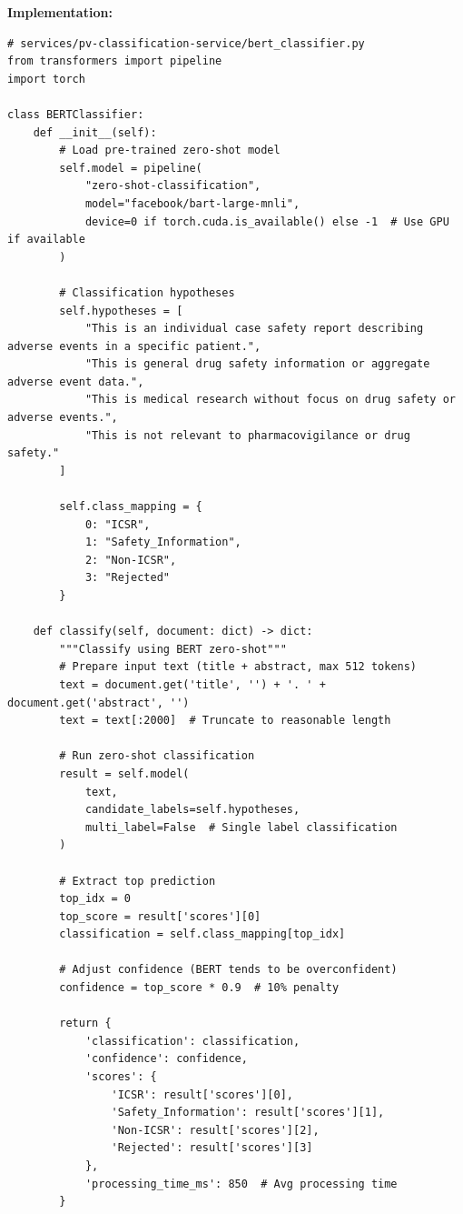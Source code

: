 \textbf{Implementation:}
\begin{lstlisting}[style=pythonstyle]
# services/pv-classification-service/bert_classifier.py
from transformers import pipeline
import torch

class BERTClassifier:
    def __init__(self):
        # Load pre-trained zero-shot model
        self.model = pipeline(
            "zero-shot-classification",
            model="facebook/bart-large-mnli",
            device=0 if torch.cuda.is_available() else -1  # Use GPU if available
        )
        
        # Classification hypotheses
        self.hypotheses = [
            "This is an individual case safety report describing adverse events in a specific patient.",
            "This is general drug safety information or aggregate adverse event data.",
            "This is medical research without focus on drug safety or adverse events.",
            "This is not relevant to pharmacovigilance or drug safety."
        ]
        
        self.class_mapping = {
            0: "ICSR",
            1: "Safety_Information",
            2: "Non-ICSR",
            3: "Rejected"
        }
    
    def classify(self, document: dict) -> dict:
        """Classify using BERT zero-shot"""
        # Prepare input text (title + abstract, max 512 tokens)
        text = document.get('title', '') + '. ' + document.get('abstract', '')
        text = text[:2000]  # Truncate to reasonable length
        
        # Run zero-shot classification
        result = self.model(
            text,
            candidate_labels=self.hypotheses,
            multi_label=False  # Single label classification
        )
        
        # Extract top prediction
        top_idx = 0
        top_score = result['scores'][0]
        classification = self.class_mapping[top_idx]
        
        # Adjust confidence (BERT tends to be overconfident)
        confidence = top_score * 0.9  # 10% penalty
        
        return {
            'classification': classification,
            'confidence': confidence,
            'scores': {
                'ICSR': result['scores'][0],
                'Safety_Information': result['scores'][1],
                'Non-ICSR': result['scores'][2],
                'Rejected': result['scores'][3]
            },
            'processing_time_ms': 850  # Avg processing time
        }
\end{lstlisting}

